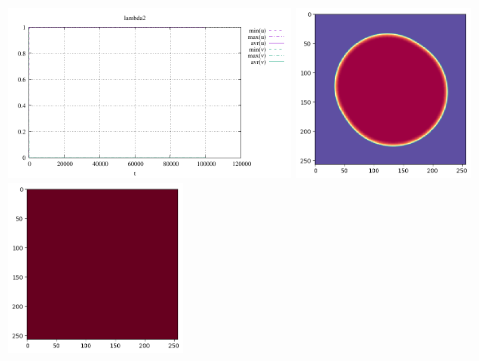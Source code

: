 \begin{center}
\includegraphics[height=4.5cm]{python_codes/fieldstone_171/results/lambda2_stats}
\includegraphics[height=4.5cm]{python_codes/fieldstone_171/results/lambda2_solution_final_u.png}
\includegraphics[height=4.5cm]{python_codes/fieldstone_171/results/lambda2_solution_final_v.png}
\end{center}


